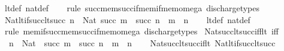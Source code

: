 \begin{isabellebody}
\ lt{\isacharunderscore}{\kern0pt}def\ nat{\isacharunderscore}{\kern0pt}def\isanewline
\ \ \isamarkupfalse%
\ {\isacharparenleft}{\kern0pt}rule\ succ{\isacharunderscore}{\kern0pt}mem{\isacharunderscore}{\kern0pt}succ{\isacharunderscore}{\kern0pt}if{\isacharunderscore}{\kern0pt}mem{\isacharunderscore}{\kern0pt}if{\isacharunderscore}{\kern0pt}mem{\isacharunderscore}{\kern0pt}omega{\isacharparenright}{\kern0pt}\ discharge{\isacharunderscore}{\kern0pt}types%
\endisatagproof
{\isafoldproof}%
%
\isadelimproof
\isanewline
%
\endisadelimproof
\isanewline
{}\isamarkupfalse%
\ Nat{\isacharunderscore}{\kern0pt}lt{\isacharunderscore}{\kern0pt}if{\isacharunderscore}{\kern0pt}succ{\isacharunderscore}{\kern0pt}lt{\isacharunderscore}{\kern0pt}succ{\isacharcolon}{\kern0pt}\ {\isachardoublequoteopen}{\isasymlbrakk}n\ {\isacharcolon}{\kern0pt}\ Nat{\isacharsemicolon}{\kern0pt}\ succ\ m\ {\isacharless}{\kern0pt}\ succ\ n{\isasymrbrakk}\ {\isasymLongrightarrow}\ m\ {\isacharless}{\kern0pt}\ n{\isachardoublequoteclose}\isanewline
%
\isadelimproof
\ \ %
\endisadelimproof
%
\isatagproof
{}\isamarkupfalse%
\ lt{\isacharunderscore}{\kern0pt}def\ nat{\isacharunderscore}{\kern0pt}def\isanewline
\ \ \isamarkupfalse%
\ {\isacharparenleft}{\kern0pt}rule\ mem{\isacharunderscore}{\kern0pt}if{\isacharunderscore}{\kern0pt}succ{\isacharunderscore}{\kern0pt}mem{\isacharunderscore}{\kern0pt}succ{\isacharunderscore}{\kern0pt}if{\isacharunderscore}{\kern0pt}mem{\isacharunderscore}{\kern0pt}omega{\isacharparenright}{\kern0pt}\ discharge{\isacharunderscore}{\kern0pt}types%
\endisatagproof
{\isafoldproof}%
%
\isadelimproof
\isanewline
%
\endisadelimproof
\isanewline
{}\isamarkupfalse%
\ Nat{\isacharunderscore}{\kern0pt}succ{\isacharunderscore}{\kern0pt}lt{\isacharunderscore}{\kern0pt}succ{\isacharunderscore}{\kern0pt}iff{\isacharunderscore}{\kern0pt}lt\ {\isacharbrackleft}{\kern0pt}iff{\isacharbrackright}{\kern0pt}{\isacharcolon}{\kern0pt}\isanewline
\ \ {\isachardoublequoteopen}n\ {\isacharcolon}{\kern0pt}\ Nat\ {\isasymLongrightarrow}\ succ\ m\ {\isacharless}{\kern0pt}\ succ\ n\ {\isasymlongleftrightarrow}\ m\ {\isacharless}{\kern0pt}\ n{\isachardoublequoteclose}\isanewline
%
\isadelimproof
\ \ %
\endisadelimproof
%
\isatagproof
{}\isamarkupfalse%
\ Nat{\isacharunderscore}{\kern0pt}succ{\isacharunderscore}{\kern0pt}lt{\isacharunderscore}{\kern0pt}succ{\isacharunderscore}{\kern0pt}if{\isacharunderscore}{\kern0pt}lt\ Nat{\isacharunderscore}{\kern0pt}lt{\isacharunderscore}{\kern0pt}if{\isacharunderscore}{\kern0pt}succ{\isacharunderscore}{\kern0pt}lt{\isacharunderscore}{\kern0pt}succ\ \isamarkupfalse%

\end{isabellebody}
